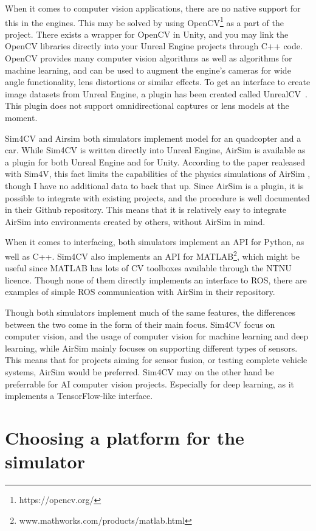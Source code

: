 When it comes to computer vision applications, there are no native support for this in the engines. This may be solved by using OpenCV\footnote{https://opencv.org/} as a part of the project. There exists a wrapper for OpenCV in Unity, and you may link the OpenCV libraries directly into your Unreal Engine projects through C++ code. OpenCV provides many computer vision algorithms as well as algorithms for machine learning, and can be used to augment the engine's cameras for wide angle functionality, lens distortions or similar effects. To get an interface to create image datasets from Unreal Engine, a plugin has been created called UnrealCV~\cite{UnrealCV}. This plugin does not support omnidirectional captures or lens models at the moment.

Sim4CV and Airsim both simulators implement model for an quadcopter and a car. While Sim4CV is written directly into Unreal Engine, AirSim is available as a plugin for both Unreal Engine and for Unity. According to the paper realeased with Sim4V, this fact limits the capabilities of the physics simulations of AirSim \cite{Sim4CV_paper}, though I have no additional data to back that up. Since AirSim is a plugin, it is possible to integrate with existing projects, and the procedure is well documented in their Github repository. This means that it is relatively easy to integrate AirSim into environments created by others, without AirSim in mind. 

When it comes to interfacing, both simulators implement an API for Python, as well as C++. Sim4CV also implements an API for MATLAB\footnote{www.mathworks.com/products/matlab.html}, which might be useful since MATLAB has lots of CV toolboxes available through the NTNU licence. Though none of them directly implements an interface to ROS, there are examples of simple ROS communication with AirSim in their repository.

Though both simulators implement much of the same features, the differences between the two come in the form of their main focus. Sim4CV focus on computer vision, and the usage of computer vision for machine learning and deep learning, while AirSim mainly focuses on supporting different types of sensors. This means that for projects aiming for sensor fusion, or testing complete vehicle systems, AirSim would be preferred. Sim4CV may on the other hand be preferrable for AI computer vision projects. Especially for deep learning, as it implements a TensorFlow-like interface.

\section{Choosing a platform for the simulator} \label{sec:Chooseplatform}

